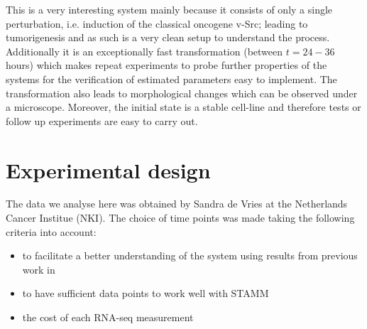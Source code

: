 This is a very interesting system mainly because it consists of only a single perturbation, i.e. induction of the classical oncogene v-Src; leading to tumorigenesis and as such is a very clean setup to understand the process. Additionally it is an exceptionally fast transformation (between $t=24-36$ hours) which makes repeat experiments to probe further properties of the systems for the verification of estimated parameters easy to implement. The transformation also leads to morphological changes which can be observed under a microscope. Moreover, the initial state is a stable cell-line and therefore tests or follow up experiments are easy to carry out.

\section{Experimental design}
\label{sec:experimental-design}

The data we analyse here was obtained by Sandra de Vries at the Netherlands Cancer Institue (NKI). The choice of time points was made taking the following criteria into account:
\begin{itemize}
\item to facilitate a better understanding of the system using results from previous work in \cite{Hirsch:2010ec}
\item to have sufficient data points to work well with STAMM
\item the cost of each RNA-seq measurement
\end{itemize}

